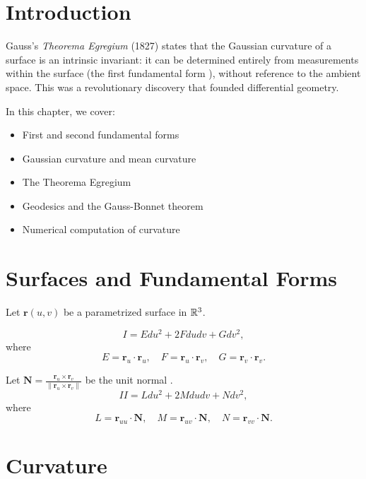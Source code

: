 \section{Introduction}

Gauss's \textit{Theorema Egregium } (1827) states that the Gaussian curvature  of a surface is an intrinsic invariant: it can be determined entirely from measurements within the surface (the first fundamental form ), without reference to the ambient space. This was a revolutionary discovery that founded differential geometry.

In this chapter, we cover:
\begin{itemize}
    \item First and second fundamental forms
    \item Gaussian curvature and mean curvature 
    \item The Theorema Egregium
    \item Geodesics and the Gauss-Bonnet  theorem
    \item Numerical computation of curvature
\end{itemize}

\section{Surfaces and Fundamental Forms}

Let $\mathbf{r}(u,v)$ be a parametrized surface  in $\mathbb{R}^3$.

\begin{definition}
\[
I = E du^2 + 2F du dv + G dv^2,
\]
where
\[
E = \mathbf{r}_u \cdot \mathbf{r}_u,\quad
F = \mathbf{r}_u \cdot \mathbf{r}_v,\quad
G = \mathbf{r}_v \cdot \mathbf{r}_v.
\]
\end{definition}

\begin{definition}
Let $\mathbf{N} = \frac{\mathbf{r}_u \times \mathbf{r}_v}{\|\mathbf{r}_u \times \mathbf{r}_v\|}$ be the unit normal .
\[
II = L du^2 + 2M du dv + N dv^2,
\]
where
\[
L = \mathbf{r}_{uu} \cdot \mathbf{N},\quad
M = \mathbf{r}_{uv} \cdot \mathbf{N},\quad
N = \mathbf{r}_{vv} \cdot \mathbf{N}.
\]
\end{definition}

\section{Curvature}

